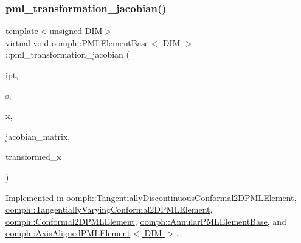 \subsubsection{\texorpdfstring{pml\+\_\+transformation\+\_\+jacobian()}{pml\_transformation\_jacobian()}\hspace{0.1cm}{\footnotesize\ttfamily [2/2]}}
{\footnotesize\ttfamily template$<$unsigned D\+IM$>$ \\
virtual void \hyperlink{classoomph_1_1PMLElementBase}{oomph\+::\+P\+M\+L\+Element\+Base}$<$ D\+IM $>$\+::pml\+\_\+transformation\+\_\+jacobian (\begin{DoxyParamCaption}\item[{const unsigned \&}]{ipt,  }\item[{const \hyperlink{classoomph_1_1Vector}{Vector}$<$ double $>$ \&}]{s,  }\item[{const \hyperlink{classoomph_1_1Vector}{Vector}$<$ double $>$ \&}]{x,  }\item[{\hyperlink{classoomph_1_1DenseComplexMatrix}{Dense\+Complex\+Matrix} \&}]{jacobian\+\_\+matrix,  }\item[{\hyperlink{classoomph_1_1Vector}{Vector}$<$ std\+::complex$<$ double $>$ $>$ \&}]{transformed\+\_\+x }\end{DoxyParamCaption})\hspace{0.3cm}{\ttfamily [pure virtual]}}



Implemented in \hyperlink{classoomph_1_1TangentiallyDiscontinuousConformal2DPMLElement_a2436ebd949ec246a11a7b617a890443e}{oomph\+::\+Tangentially\+Discontinuous\+Conformal2\+D\+P\+M\+L\+Element}, \hyperlink{classoomph_1_1TangentiallyVaryingConformal2DPMLElement_a56a6af4af3774579d49d9dcc8c7e9bea}{oomph\+::\+Tangentially\+Varying\+Conformal2\+D\+P\+M\+L\+Element}, \hyperlink{classoomph_1_1Conformal2DPMLElement_a1d352e991b9ad7622c27b82d474b4877}{oomph\+::\+Conformal2\+D\+P\+M\+L\+Element}, \hyperlink{classoomph_1_1AnnularPMLElementBase_a071a64f7677e50ee93c5c568ca59fff2}{oomph\+::\+Annular\+P\+M\+L\+Element\+Base}, and \hyperlink{classoomph_1_1AxisAlignedPMLElement_a808e638b642342a84da6749cdcdf78e4}{oomph\+::\+Axis\+Aligned\+P\+M\+L\+Element$<$ D\+I\+M $>$}.

\mbox{\label{classoomph_1_1PMLElementBase_ad63639f1966cd3191fad69852732fd90}} 
